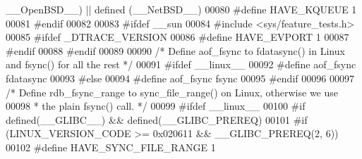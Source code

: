 \begin{DoxyCode}
{      \_\_OpenBSD\_\_}\textcolor{preprocessor}{)} \textcolor{preprocessor}{||} \textcolor{preprocessor}{defined} \textcolor{preprocessor}{(}\textcolor{preprocessor}{\_\_NetBSD\_\_}\textcolor{preprocessor}{)}
00080 \textcolor{preprocessor}{#}\textcolor{preprocessor}{define} \textcolor{preprocessor}{HAVE\_KQUEUE} 1
00081 \textcolor{preprocessor}{#}\textcolor{preprocessor}{endif}
00082 
00083 \textcolor{preprocessor}{#}\textcolor{preprocessor}{ifdef} \textcolor{preprocessor}{\_\_sun}
00084 \textcolor{preprocessor}{#}\textcolor{preprocessor}{include} \textcolor{preprocessor}{<}\textcolor{preprocessor}{sys}\textcolor{preprocessor}{/}\textcolor{preprocessor}{feature\_tests}\textcolor{preprocessor}{.}\textcolor{preprocessor}{h}\textcolor{preprocessor}{>}
00085 \textcolor{preprocessor}{#}\textcolor{preprocessor}{ifdef} \textcolor{preprocessor}{\_DTRACE\_VERSION}
00086 \textcolor{preprocessor}{#}\textcolor{preprocessor}{define} \textcolor{preprocessor}{HAVE\_EVPORT} 1
00087 \textcolor{preprocessor}{#}\textcolor{preprocessor}{endif}
00088 \textcolor{preprocessor}{#}\textcolor{preprocessor}{endif}
00089 
00090 \textcolor{comment}{/* Define aof\_fsync to fdatasync() in Linux and fsync() for all the rest */}
00091 \textcolor{preprocessor}{#}\textcolor{preprocessor}{ifdef} \_\_linux\_\_
00092 \textcolor{preprocessor}{#}\textcolor{preprocessor}{define} \textcolor{preprocessor}{aof\_fsync} \textcolor{preprocessor}{fdatasync}
00093 \textcolor{preprocessor}{#}\textcolor{preprocessor}{else}
00094 \textcolor{preprocessor}{#}\textcolor{preprocessor}{define} \textcolor{preprocessor}{aof\_fsync} \textcolor{preprocessor}{fsync}
00095 \textcolor{preprocessor}{#}\textcolor{preprocessor}{endif}
00096 
00097 \textcolor{comment}{/* Define rdb\_fsync\_range to sync\_file\_range() on Linux, otherwise we use}
00098 \textcolor{comment}{ * the plain fsync() call. */}
00099 \textcolor{preprocessor}{#}\textcolor{preprocessor}{ifdef} \_\_linux\_\_
00100 \textcolor{preprocessor}{#}\textcolor{preprocessor}{if} \textcolor{preprocessor}{defined}\textcolor{preprocessor}{(}\_\_GLIBC\_\_\textcolor{preprocessor}{)} \textcolor{preprocessor}{&&} \textcolor{preprocessor}{defined}\textcolor{preprocessor}{(}\_\_GLIBC\_PREREQ\textcolor{preprocessor}{)}
00101 \textcolor{preprocessor}{#}\textcolor{preprocessor}{if} \textcolor{preprocessor}{(}LINUX\_VERSION\_CODE \textcolor{preprocessor}{>=} 0x020611 \textcolor{preprocessor}{&&} \_\_GLIBC\_PREREQ\textcolor{preprocessor}{(}2\textcolor{preprocessor}{,} 6\textcolor{preprocessor}{)}\textcolor{preprocessor}{)}
00102 \textcolor{preprocessor}{#}\textcolor{preprocessor}{define} \textcolor{preprocessor}{HAVE\_SYNC\_FILE\_RANGE} 1

\end{DoxyCode}
